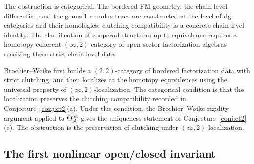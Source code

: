 \begin{remark}
\label{rem:ct2-brochier-woike}
The obstruction is categorical. The bordered FM geometry, the
chain-level differential, and the genus-$1$ annulus trace are
constructed at the level of dg categories and their homologies;
clutching compatibility is a concrete chain-level identity. The
classification of cooperad structures up to equivalence requires a
homotopy-coherent $(\infty,2)$-category of open-sector
factorization algebras receiving these strict chain-level data.

Brochier--Woike \cite{BrochierWoike2022} first builds a
$(2,2)$-category of bordered
factorization data with strict clutching, and then localizes at
the homotopy equivalences using the universal property of
$(\infty,2)$-localization. The categorical condition is that
the localization preserves the clutching compatibility recorded in
Conjecture~\ref{conj:ct2}(a). Under this condition, the
Brochier--Woike rigidity argument applied to
$\Theta^{\mathrm{oc}}_{\mathcal{A}}$ gives the uniqueness statement of
Conjecture~\ref{conj:ct2}(c). The obstruction is the preservation
of clutching under $(\infty,2)$-localization.
\end{remark}

\subsection{The first nonlinear open/closed invariant}
\label{subsec:thqg-nonlinear-oc-invariant}


